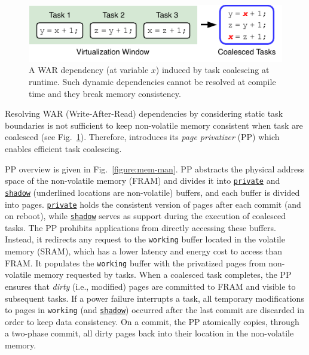\begin{figure}
	\centering
	\includegraphics[width=\columnwidth]{figures/coalesced-war.pdf}
	\caption{A WAR dependency (at variable $x$) induced by task coalescing at runtime. Such dynamic dependencies cannot be resolved at compile time and they break memory consistency.
}
	\label{figure:coalescedWar}
\end{figure}

Resolving WAR (Write-After-Read) dependencies by considering static task boundaries is not sufficient to keep non-volatile memory consistent when task are coalesced (see Fig.~\ref{figure:coalescedWar}). Therefore, \sys introduces its {\em page privatizer} (PP) which enables efficient task coalescing.


PP overview is given in Fig.~\ref{figure:mem-man}.
PP abstracts the physical address space of the non-volatile memory (FRAM) and divides it into \texttt{\underline{private}} and \texttt{\underline{shadow}} (underlined locations are non-volatile) buffers, and each buffer is divided into pages.
\texttt{\underline{private}} holds the consistent version of pages after each commit (and on reboot), while \texttt{\underline{shadow}} serves as support during the execution of coalesced tasks.
The PP prohibits applications from directly accessing these buffers.
Instead, it redirects any request to the \texttt{working} buffer located in the volatile memory (SRAM), which has a lower latency and energy cost to access than FRAM.
It populates the \texttt{working} buffer with the privatized pages from non-volatile memory requested by tasks.
When a coalesced task completes, the PP ensures that {\em dirty} (i.e., modified) pages are committed to FRAM and visible to subsequent tasks.
If a power failure interrupts a task, all temporary modifications to pages in \texttt{working} (and \texttt{\underline{shadow}}) occurred after the last commit are discarded in order to keep data consistency.
On a commit, the PP atomically copies, through a two-phase commit, all dirty pages back into their location in the non-volatile memory.

